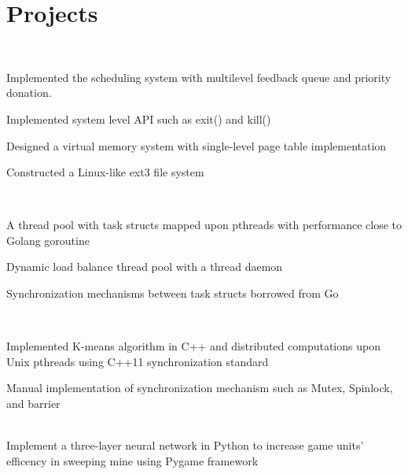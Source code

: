 \documentclass[]{deedy-resume-openfont}
\begin{document}
\section{Projects}
\raggedright

\\
\begin{tightemize}
	\item Implemented the scheduling system with multilevel feedback queue and priority donation.
	\item Implemented system level API such as exit() and kill()
	\item Designed a virtual memory system with single-level page table implementation
	\item Constructed a Linux-like ext3 file system
\end{tightemize}
\sectionsep
  
\\
\begin{tightemize}
	\item A thread pool with task structs mapped upon pthreads with performance close to Golang goroutine
	\item Dynamic load balance thread pool with a thread daemon
	\item Synchronization mechanisms between task structs borrowed from Go
\end{tightemize}

\hfill \\
\begin{tightemize}
	\item Implemented K-means algorithm in C++ and distributed computations upon Unix pthreads using C++11 synchronization standard
	\item Manual implementation of synchronization mechanism such as Mutex, Spinlock, and barrier
\end{tightemize}
\sectionsep

\\
Implement a three-layer neural network in Python to increase game units' efficency in sweeping mine using Pygame framework\\
\sectionsep
%
%
\end{document}
